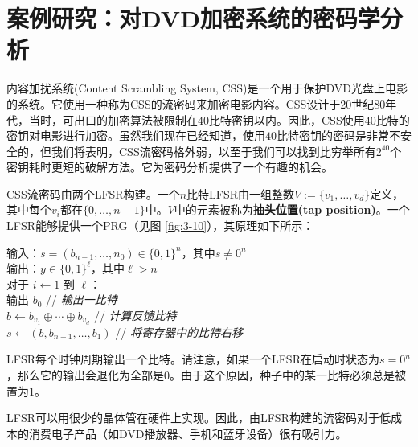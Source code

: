 \section{案例研究：对DVD加密系统的密码学分析}

内容加扰系统(Content Scrambling System, CSS)是一个用于保护DVD光盘上电影的系统。它使用一种称为CSS的流密码来加密电影内容。CSS设计于20世纪80年代，当时，可出口的加密算法被限制在$40$比特密钥以内。因此，CSS使用$40$比特的密钥对电影进行加密。虽然我们现在已经知道，使用$40$比特密钥的密码是非常不安全的，但我们将表明，CSS流密码格外弱，以至于我们可以找到比穷举所有$2^{40}$个密钥耗时更短的破解方法。它为密码分析提供了一个有趣的机会。

\begin{snote}
CSS流密码由两个LFSR构建。一个$n$比特LFSR由一组整数$V:=\{v_1,\dots,v_d\}$定义，其中每个$v_i$都在$\{0,\dots,n-1\}$中。$V$中的元素被称为\textbf{抽头位置(tap position)}。一个LFSR能够提供一个PRG（见图 \ref{fig:3-10}），其原理如下所示：

\vspace*{5pt}

\hspace*{5pt} 输入：$s=(b_{n-1},\dots,n_0)\in\{0,1\}^n$，其中$s\neq 0^n$\\
\hspace*{26pt} 输出：$y\in\{0,1\}^\ell$，其中$\ell>n$\\
\hspace*{26pt} 对于 $i\leftarrow1$ 到 $\ell$：\\
\hspace*{26pt} \quad\quad\quad 输出 $b_0$ \hspace*{81.5pt} // \emph{输出一比特}\\
\hspace*{26pt} \quad\quad\quad $b\leftarrow b_{v_1}\oplus\cdots\oplus b_{v_d}$ \hspace*{29.5pt} // \emph{计算反馈比特}\\
\hspace*{26pt} \quad\quad\quad $s\leftarrow(b,b_{n-1},\dots,b_1)$ \hspace*{23pt} // \emph{将寄存器中的比特右移}

\vspace*{5pt}

\noindent
LFSR每个时钟周期输出一个比特。请注意，如果一个LFSR在启动时状态为$s=0^n$，那么它的输出会退化为全部是$0$。由于这个原因，种子中的某一比特必须总是被置为$1$。

LFSR可以用很少的晶体管在硬件上实现。因此，由LFSR构建的流密码对于低成本的消费电子产品（如DVD播放器、手机和蓝牙设备）很有吸引力。
\end{snote}

